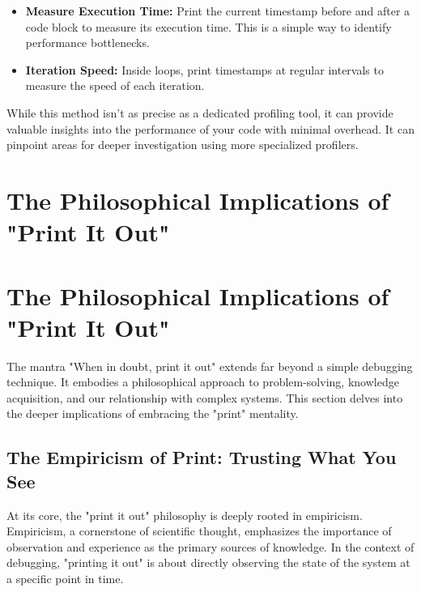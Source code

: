 \documentclass{article}
\begin{document}
{{{{\begin{itemize}
    \item \textbf{Measure Execution Time:} Print the current timestamp before and after a code block to measure its execution time. This is a simple way to identify performance bottlenecks.
    \item \textbf{Iteration Speed:} Inside loops, print timestamps at regular intervals to measure the speed of each iteration.
\end{itemize}

While this method isn't as precise as a dedicated profiling tool, it can provide valuable insights into the performance of your code with minimal overhead. It can pinpoint areas for deeper investigation using more specialized profilers.

\newpage

\section*{The Philosophical Implications of "Print It Out"} %
\label{chapter-10-7-The_Philosophical_Implications_of__Print}

\section*{The Philosophical Implications of "Print It Out"}

The mantra "When in doubt, print it out" extends far beyond a simple debugging technique. It embodies a philosophical approach to problem-solving, knowledge acquisition, and our relationship with complex systems. This section delves into the deeper implications of embracing the "print" mentality.

\subsection*{The Empiricism of Print: Trusting What You See}

At its core, the "print it out" philosophy is deeply rooted in empiricism. Empiricism, a cornerstone of scientific thought, emphasizes the importance of observation and experience as the primary sources of knowledge. In the context of debugging, "printing it out" is about directly observing the state of the system at a specific point in time.

}}}}
\end{document}

